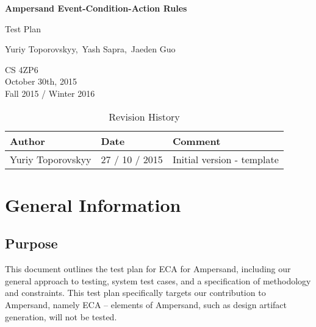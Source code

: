 \documentclass[12pt]{report}
\begin{document}
\begin{titlepage}\begin{center}
\thispagestyle{empty} %

\vspace*{1cm}

{\Huge\textbf{Ampersand Event-Condition-Action Rules}}

\vspace{0.5cm}
{\Large Test Plan

\vspace{1.5cm}
Yuriy Toporovskyy,\ Yash Sapra,\ Jaeden Guo}
\vfill 


\end{center}
CS 4ZP6 \\
October 30th, 2015 \\ 
Fall 2015 / Winter 2016 
\end{titlepage}


\begin{table}[ht!]\begin{center}
\caption{Revision History}  
\begin{tabular}{|l|l|l|}\hline
\textbf{Author} & \textbf{Date} & \textbf{Comment} \\\hline 
Yuriy Toporovskyy & 27 / 10 / 2015 & Initial version - template \\\hline
\end{tabular}
\end{center}\end{table}

\newpage

\tableofcontents
\listoffigures
\listoftables

\newpage
{} %

%
%

\chapter{General Information}

\section{Purpose} 
This document outlines the test plan for ECA for Ampersand, including our
general approach to testing, system test cases, and a specification of
methodology and constraints. This test plan specifically targets our
contribution to Ampersand, namely ECA -- elements of Ampersand, such as design
artifact generation, will not be tested. 
\end{document}
